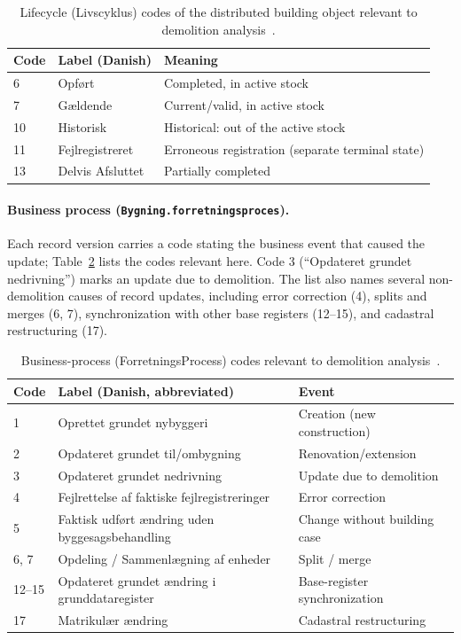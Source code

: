 \begin{table}[htbp]
\centering
\caption{Lifecycle (Livscyklus) codes of the distributed building object
relevant to demolition analysis~\cite{bbr_kodelister}.}
\label{tab:status-codes}
\begin{tabular}{@{}lll@{}}
\toprule
Code & Label (Danish) & Meaning \\
\midrule
6  & Opf{\o}rt            & Completed, in active stock \\
7  & G{\ae}ldende         & Current/valid, in active stock \\
10 & Historisk            & Historical: out of the active stock \\
11 & Fejlregistreret      & Erroneous registration (separate terminal state) \\
13 & Delvis Afsluttet     & Partially completed \\
\bottomrule
\end{tabular}
\end{table}

\paragraph{Business process (\texttt{Bygning.forretningsproces}).}
Each record version carries a code stating the business event that
caused the update; Table~\ref{tab:bp-codes} lists the codes relevant
here. Code 3 (``Opdateret grundet nedrivning'') marks an update due to
demolition. The list also names several non-demolition causes of record
updates, including error correction (4), splits and merges (6, 7),
synchronization with other base registers (12--15), and cadastral
restructuring (17).

\begin{table}[htbp]
\centering
\caption{Business-process (ForretningsProcess) codes relevant to
demolition analysis~\cite{bbr_kodelister}.}
\label{tab:bp-codes}
\begin{tabular}{@{}lp{6.2cm}l@{}}
\toprule
Code & Label (Danish, abbreviated) & Event \\
\midrule
1      & Oprettet grundet nybyggeri & Creation (new construction) \\
2      & Opdateret grundet til/ombygning & Renovation/extension \\
3      & Opdateret grundet nedrivning & Update due to demolition \\
4      & Fejlrettelse af faktiske fejlregistreringer & Error correction \\
5      & Faktisk udf{\o}rt {\ae}ndring uden byggesagsbehandling & Change without building case \\
6, 7   & Opdeling / Sammenl{\ae}gning af enheder & Split / merge \\
12--15 & Opdateret grundet {\ae}ndring i grunddataregister & Base-register synchronization \\
17     & Matrikul{\ae}r {\ae}ndring & Cadastral restructuring \\
\bottomrule
\end{tabular}
\end{table}


